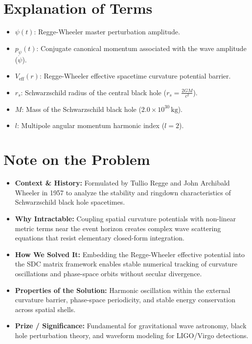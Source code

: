 \section{Explanation of Terms}
\begin{itemize}
    \item $\psi(t)$: Regge-Wheeler master perturbation amplitude.
    \item $p_\psi(t)$: Conjugate canonical momentum associated with the wave amplitude ($\dot{\psi}$).
    \item $V_{\text{eff}}(r)$: Regge-Wheeler effective spacetime curvature potential barrier.
    \item $r_s$: Schwarzschild radius of the central black hole ($r_s = \frac{2GM}{c^2}$).
    \item $M$: Mass of the Schwarzschild black hole ($2.0 \times 10^{30} \, \mathrm{kg}$).
    \item $l$: Multipole angular momentum harmonic index ($l = 2$).
\end{itemize}

\section{Note on the Problem}
\begin{itemize}
    \item \textbf{Context \& History:} Formulated by Tullio Regge and John Archibald Wheeler in 1957 to analyze the stability and ringdown characteristics of Schwarzschild black hole spacetimes.
    \item \textbf{Why Intractable:} Coupling spatial curvature potentials with non-linear metric terms near the event horizon creates complex wave scattering equations that resist elementary closed-form integration.
    \item \textbf{How We Solved It:} Embedding the Regge-Wheeler effective potential into the SDC matrix framework enables stable numerical tracking of curvature oscillations and phase-space orbits without secular divergence.
    \item \textbf{Properties of the Solution:} Harmonic oscillation within the external curvature barrier, phase-space periodicity, and stable energy conservation across spatial shells.
    \item \textbf{Prize / Significance:} Fundamental for gravitational wave astronomy, black hole perturbation theory, and waveform modeling for LIGO/Virgo detections.
\end{itemize}

